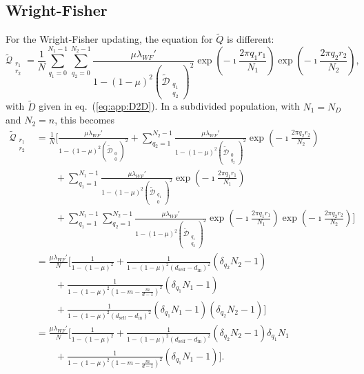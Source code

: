 \documentclass[11pt, letterpaper]{article}
\renewcommand{\eqref}[1]{\textup{{\normalfont eq.~(\ref{#1}}\normalfont)}}
\newcommand{\din}{d_{\textrm{in}}}
\newcommand{\dself}{d_{\textrm{self}}}
\newcommand{\ndemes}{N_D}
\begin{document}
\subsection{Wright-Fisher}
For the Wright-Fisher updating, the equation for $\tilde{Q}$ is different:
\begin{equation}
\tilde{\mathcal{Q}}_{\substack{r_1\\r_2}} = \frac{1}{N} \sum_{q_1=0}^{N_1-1} \sum_{q_2=0}^{N_2 -1} \frac{\mu \lambda_{WF}'}{1-(1-\mu)^2 (\tilde{\mathcal{D}}_{\substack{q_1\\q_2}})^2} \exp\left(-\imath \frac{2\pi q_1 r_1}{N_1}\right)\exp\left(-\imath \frac{2\pi q_2 r_2}{N_2}\right), 
\end{equation}
with $\tilde{D}$ given in \eqref{eq:app:D2D}. In a subdivided population, with $N_1 = \ndemes$ and $N_2 = n$, this becomes
\begin{align}
\tilde{\mathcal{Q}}_{\substack{r_1\\r_2}} 
%
& = \frac{1}{N} \Bigg[ 
\frac{\mu \lambda_{WF}'}{1-(1-\mu)^2 (\tilde{\mathcal{D}}_{\substack{0\\0}})^2} 
+ \sum_{q_2=1}^{N_2-1} \frac{\mu \lambda_{WF}'}{1-(1-\mu)^2 (\tilde{\mathcal{D}}_{\substack{0\\q_2}})^2} \exp\left(-\imath \frac{2\pi q_2 r_2}{N_2}\right) \nonumber \\
& \qquad + \sum_{q_1=1}^{N_1-1} \frac{\mu \lambda_{WF}'}{1-(1-\mu)^2 (\tilde{\mathcal{D}}_{\substack{q_1\\0}})^2} \exp\left(-\imath \frac{2\pi q_1 r_1}{N_1}\right)  \nonumber \\
& \qquad + \sum_{q_1=1}^{N_1-1} \sum_{q_2=1}^{N_2 -1} \frac{\mu \lambda_{WF}'}{1-(1-\mu)^2 (\tilde{\mathcal{D}}_{\substack{q_1\\q_2}})^2} \exp\left(-\imath \frac{2\pi q_1 r_1}{N_1}\right)\exp\left(-\imath \frac{2\pi q_2 r_2}{N_2}\right)
 \Bigg] \nonumber\\
& = \frac{\mu \lambda_{WF}'}{N} \Bigg[ 
\frac{1}{1-(1-\mu)^2 } 
%
+ \frac{1}{1-(1-\mu)^2 (\dself - \din)^2} (\delta_{q_2} N_2 - 1) \nonumber \\
%
& \qquad +  \frac{1}{1-(1-\mu)^2 (1-m-\frac{m}{d-1})^2} (\delta_{q_1} N_1 - 1) \nonumber \\
%
& \qquad +  \frac{1}{1-(1-\mu)^2 (\dself - \din)^2} (\delta_{q_1} N_1 - 1)(\delta_{q_2} N_2 - 1)
 \Bigg] \nonumber\\
& = \frac{\mu \lambda_{WF}'}{N} \Bigg[ 
\frac{1}{1-(1-\mu)^2 } 
%
+ \frac{1}{1-(1-\mu)^2 (\dself - \din)^2} (\delta_{q_2} N_2 - 1) \delta_{q_1} N_1 \nonumber \\
%
& \qquad +  \frac{1}{1-(1-\mu)^2 (1-m-\frac{m}{d-1})^2} (\delta_{q_1} N_1 - 1) 
\Bigg] . \label{eq:app:Q2DWFsol}
\end{align}
\end{document}
